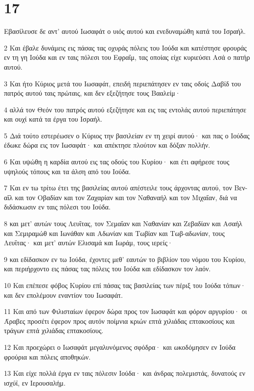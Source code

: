 \chapter{17}

\par Εβασίλευσε δε αντ' αυτού Ιωσαφάτ ο υιός αυτού και ενεδυναμώθη κατά του Ισραήλ.
\par 2 Και έβαλε δυνάμεις εις πάσας τας οχυράς πόλεις του Ιούδα και κατέστησε φρουράς εν τη γη Ιούδα και εν ταις πόλεσι του Εφραΐμ, τας οποίας είχε κυριεύσει Ασά ο πατήρ αυτού.
\par 3 Και ήτο Κύριος μετά του Ιωσαφάτ, επειδή περιεπάτησεν εν ταις οδοίς Δαβίδ του πατρός αυτού ταις πρώταις, και δεν εξεζήτησε τους Βααλείμ·
\par 4 αλλά τον Θεόν του πατρός αυτού εξεζήτησε και εις τας εντολάς αυτού περιεπάτησε και ουχί κατά τα έργα του Ισραήλ.
\par 5 Διά τούτο εστερέωσεν ο Κύριος την βασιλείαν εν τη χειρί αυτού· και πας ο Ιούδας έδωκε δώρα εις τον Ιωσαφάτ· και απέκτησε πλούτον και δόξαν πολλήν.
\par 6 Και υψώθη η καρδία αυτού εις τας οδούς του Κυρίου· και έτι αφήρεσε τους υψηλούς τόπους και τα άλση από του Ιούδα.
\par 7 Και εν τω τρίτω έτει της βασιλείας αυτού απέστειλε τους άρχοντας αυτού, τον Βεν-αΐλ και τον Οβαδίαν και τον Ζαχαρίαν και τον Ναθαναήλ και τον Μιχαΐαν, διά να διδάσκωσιν εν ταις πόλεσι του Ιούδα.
\par 8 και μετ' αυτών τους Λευΐτας, τον Σεμαΐαν και Ναθανίαν και Ζεβαδίαν και Ασαήλ και Σεμιραμώθ και Ιωνάθαν και Αδωνίαν και Τωβίαν και Τωβ-αδωνίαν, τους Λευΐτας· και μετ' αυτών Ελισαμά και Ιωράμ, τους ιερείς·
\par 9 και εδίδασκον εν τω Ιούδα, έχοντες μεθ' εαυτών το βιβλίον του νόμου του Κυρίου, και περιήρχοντο εις πάσας τας πόλεις του Ιούδα και εδίδασκον τον λαόν.
\par 10 Και επέπεσε φόβος Κυρίου επί πάσας τας βασιλείας των πέριξ του Ιούδα τόπων· και δεν επολέμουν εναντίον του Ιωσαφάτ.
\par 11 Και από των Φιλισταίων έφερον δώρα προς τον Ιωσαφάτ και φόρον αργυρίου· οι Άραβες προσέτι έφερον προς αυτόν ποίμνια κριών επτά χιλιάδας επτακοσίους και τράγων επτά χιλιάδας επτακοσίους.
\par 12 Και προεχώρει ο Ιωσαφάτ μεγαλυνόμενος σφόδρα· και ωκοδόμησεν εν Ιούδα φρούρια και πόλεις αποθηκών.
\par 13 Και είχε πολλά έργα εν ταις πόλεσιν Ιούδα· και άνδρας πολεμιστάς, δυνατούς εν ισχύϊ, εν Ιερουσαλήμ.
